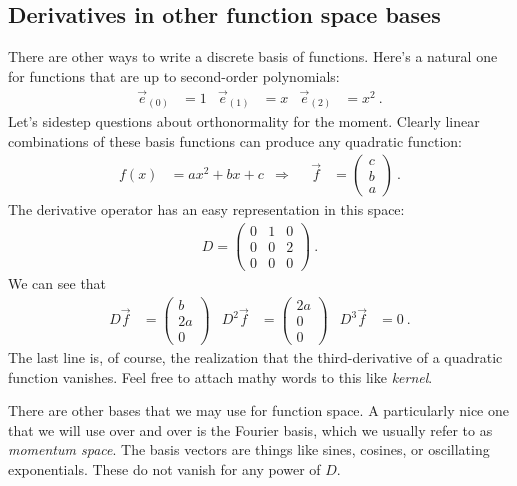\subsection{Derivatives in other function space bases}

There are other ways to write a discrete basis of functions. Here’s a natural one for functions that are up to second-order polynomials:
\begin{align}
  \vec{e}_{(0)} &= 1
  &
  \vec{e}_{(1)} &= x
  &
  \vec{e}_{(2)} &= x^2 \ .
\end{align}
Let’s sidestep questions about orthonormality for the moment. Clearly linear combinations of these basis functions can produce any quadratic function:
\begin{align}
  f(x) &= a x^2 + bx + c
  & \Rightarrow&&
  \vec{f} &=
  \begin{pmatrix}
     c \\ b \\ a
   \end{pmatrix} \ . 
\end{align}
The derivative operator has an easy representation in this space:
\begin{align}
  D = 
  \begin{pmatrix}
    0 & 1 & 0   \\
    0 & 0 & 2   \\
    0 & 0 & 0   
  \end{pmatrix} \ .
\end{align}
We can see that
\begin{align}
  D \vec{f}  &= 
  \begin{pmatrix}
     b \\
     2 a \\
     0
  \end{pmatrix} 
  &
  D^2 \vec{f}  &= 
  \begin{pmatrix}
     2a \\
     0 \\
     0
  \end{pmatrix} 
  &
  D^3 \vec{f}  &= 
  0 \ .
\end{align}
The last line is, of course, the realization that the third-derivative of a quadratic function vanishes. Feel free to attach mathy words to this like \emph{kernel}.

There are other bases that we may use for function space. A particularly nice one that we will use over and over is the Fourier basis, which we usually refer to as \emph{momentum space}. The basis vectors are things like sines, cosines, or oscillating exponentials. These do not vanish for any power of $D$.



